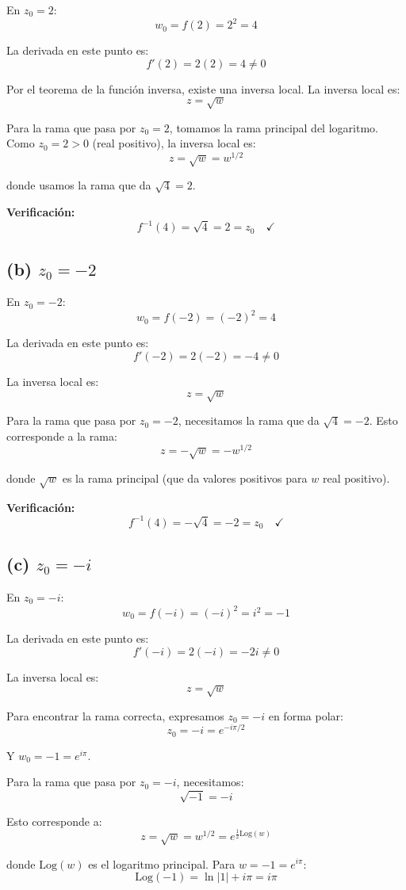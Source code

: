 \documentclass{article}
\begin{document}
En $z_0 = 2$:
$$w_0 = f(2) = 2^2 = 4$$

La derivada en este punto es:
$$f'(2) = 2(2) = 4 \neq 0$$

Por el teorema de la función inversa, existe una inversa local. La inversa local es:
$$z = \sqrt{w}$$

Para la rama que pasa por $z_0 = 2$, tomamos la rama principal del logaritmo. Como $z_0 = 2 > 0$ (real positivo), la inversa local es:
$$z = \sqrt{w} = w^{1/2}$$

donde usamos la rama que da $\sqrt{4} = 2$.

\textbf{Verificación:}
$$f^{-1}(4) = \sqrt{4} = 2 = z_0 \quad \checkmark$$

\subsection*{(b) $z_0 = -2$}

En $z_0 = -2$:
$$w_0 = f(-2) = (-2)^2 = 4$$

La derivada en este punto es:
$$f'(-2) = 2(-2) = -4 \neq 0$$

La inversa local es:
$$z = \sqrt{w}$$

Para la rama que pasa por $z_0 = -2$, necesitamos la rama que da $\sqrt{4} = -2$. Esto corresponde a la rama:
$$z = -\sqrt{w} = -w^{1/2}$$

donde $\sqrt{w}$ es la rama principal (que da valores positivos para $w$ real positivo).

\textbf{Verificación:}
$$f^{-1}(4) = -\sqrt{4} = -2 = z_0 \quad \checkmark$$

\subsection*{(c) $z_0 = -i$}

En $z_0 = -i$:
$$w_0 = f(-i) = (-i)^2 = i^2 = -1$$

La derivada en este punto es:
$$f'(-i) = 2(-i) = -2i \neq 0$$

La inversa local es:
$$z = \sqrt{w}$$

Para encontrar la rama correcta, expresamos $z_0 = -i$ en forma polar:
$$z_0 = -i = e^{-i\pi/2}$$

Y $w_0 = -1 = e^{i\pi}$.

Para la rama que pasa por $z_0 = -i$, necesitamos:
$$\sqrt{-1} = -i$$

Esto corresponde a:
$$z = \sqrt{w} = w^{1/2} = e^{\frac{1}{2}\text{Log}(w)}$$

donde $\text{Log}(w)$ es el logaritmo principal. Para $w = -1 = e^{i\pi}$:
$$\text{Log}(-1) = \ln|1| + i\pi = i\pi$$
\end{document}
